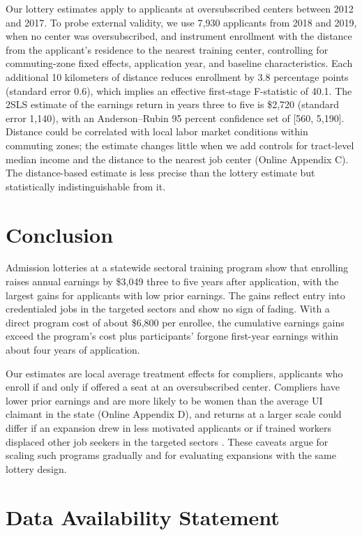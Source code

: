 \documentclass[12pt]{article}
\begin{document}
Our lottery estimates apply to applicants at oversubscribed centers between 2012 and 2017. To probe external validity, we use 7,930 applicants from 2018 and 2019, when no center was oversubscribed, and instrument enrollment with the distance from the applicant's residence to the nearest training center, controlling for commuting-zone fixed effects, application year, and baseline characteristics. Each additional 10 kilometers of distance reduces enrollment by 3.8 percentage points (standard error 0.6), which implies an effective first-stage F-statistic of 40.1. The 2SLS estimate of the earnings return in years three to five is \$2,720 (standard error 1,140), with an Anderson--Rubin 95 percent confidence set of [560, 5,190]. Distance could be correlated with local labor market conditions within commuting zones; the estimate changes little when we add controls for tract-level median income and the distance to the nearest job center (Online Appendix C). The distance-based estimate is less precise than the lottery estimate but statistically indistinguishable from it.

\section{Conclusion}\label{sec:conclusion}

Admission lotteries at a statewide sectoral training program show that enrolling raises annual earnings by \$3,049 three to five years after application, with the largest gains for applicants with low prior earnings. The gains reflect entry into credentialed jobs in the targeted sectors and show no sign of fading. With a direct program cost of about \$6,800 per enrollee, the cumulative earnings gains exceed the program's cost plus participants' forgone first-year earnings within about four years of application.

Our estimates are local average treatment effects for compliers, applicants who enroll if and only if offered a seat at an oversubscribed center. Compliers have lower prior earnings and are more likely to be women than the average UI claimant in the state (Online Appendix D), and returns at a larger scale could differ if an expansion drew in less motivated applicants or if trained workers displaced other job seekers in the targeted sectors \citep{crepon2013}. These caveats argue for scaling such programs gradually and for evaluating expansions with the same lottery design.

\section*{Data Availability Statement}
\end{document}
